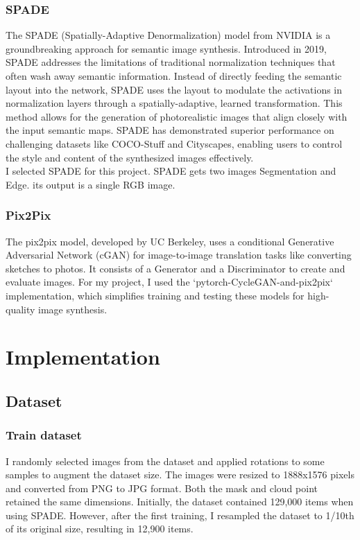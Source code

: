 \subsubsection{SPADE}
The SPADE (Spatially-Adaptive Denormalization) model from NVIDIA is a groundbreaking approach for semantic image synthesis. Introduced in 2019, SPADE addresses the limitations of traditional normalization techniques that often wash away semantic information. Instead of directly feeding the semantic layout into the network, SPADE uses the layout to modulate the activations in normalization layers through a spatially-adaptive, learned transformation. This method allows for the generation of photorealistic images that align closely with the input semantic maps. SPADE has demonstrated superior performance on challenging datasets like COCO-Stuff and Cityscapes, enabling users to control the style and content of the synthesized images effectively.
\\ I selected SPADE for this project. SPADE gets two images Segmentation and Edge. its output is a single RGB image.
\subsubsection{Pix2Pix}
The pix2pix model, developed by UC Berkeley, uses a conditional Generative Adversarial Network (cGAN) for image-to-image translation tasks like converting sketches to photos. It consists of a Generator and a Discriminator to create and evaluate images. For my project, I used the `pytorch-CycleGAN-and-pix2pix` implementation, which simplifies training and testing these models for high-quality image synthesis.
\section{Implementation}
\subsection{Dataset}
\subsubsection{Train dataset}
I randomly selected images from the dataset and applied rotations to some samples to augment the dataset size. The images were resized to 1888x1576 pixels and converted from PNG to JPG format. Both the mask and cloud point retained the same dimensions. Initially, the dataset contained 129,000 items when using SPADE. However, after the first training, I resampled the dataset to 1/10th of its original size, resulting in 12,900 items.

